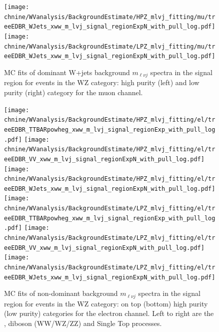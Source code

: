 \begin{figure}[htbp]
\centering
\texttt{[image: \\chnine/WVanalysis/BackgroundEstimate/HPZ\_mlvj\_fitting/mu/treeEDBR\_WJets\_xww\_m\_lvj\_signal\_regionExpN\_with\_pull\_log.pdf]}
\texttt{[image: \\chnine/WVanalysis/BackgroundEstimate/LPZ\_mlvj\_fitting/mu/treeEDBR\_WJets\_xww\_m\_lvj\_signal\_regionExpN\_with\_pull\_log.pdf]}\\
\caption{MC fits of dominant W+jets background $m_{\ell\nu j}$ spectra in the \mJ signal region for events in the WZ category:
high purity (left) and low purity (right) category for the muon channel.}
\label{fig:srZfitmlvj_1b}
\end{figure}


\begin{figure}[htbp]
\centering
\texttt{[image: \\chnine/WVanalysis/BackgroundEstimate/HPZ\_mlvj\_fitting/el/treeEDBR\_TTBARpowheg\_xww\_m\_lvj\_signal\_regionExp\_with\_pull\_log.pdf]}
\texttt{[image: \\chnine/WVanalysis/BackgroundEstimate/HPZ\_mlvj\_fitting/el/treeEDBR\_VV\_xww\_m\_lvj\_signal\_regionExpN\_with\_pull\_log.pdf]}
\texttt{[image: \\chnine/WVanalysis/BackgroundEstimate/HPZ\_mlvj\_fitting/el/treeEDBR\_WJets\_xww\_m\_lvj\_signal\_regionExpN\_with\_pull\_log.pdf]}\\
\texttt{[image: \\chnine/WVanalysis/BackgroundEstimate/LPZ\_mlvj\_fitting/el/treeEDBR\_TTBARpowheg\_xww\_m\_lvj\_signal\_regionExp\_with\_pull\_log.pdf]}
\texttt{[image: \\chnine/WVanalysis/BackgroundEstimate/LPZ\_mlvj\_fitting/el/treeEDBR\_VV\_xww\_m\_lvj\_signal\_regionExpN\_with\_pull\_log.pdf]}
\texttt{[image: \\chnine/WVanalysis/BackgroundEstimate/LPZ\_mlvj\_fitting/el/treeEDBR\_WJets\_xww\_m\_lvj\_signal\_regionExpN\_with\_pull\_log.pdf]}\\
\caption{MC fits of non-dominant background $m_{\ell\nu j}$ spectra in the \mJ signal region for events in the WZ category: on top (bottom) high purity (low purity) categories for the electron channel. Left to right are the \ttbar, diboson (WW/WZ/ZZ) and Single Top processes.}
\label{fig:srZfitmlvj_2}
\end{figure}

